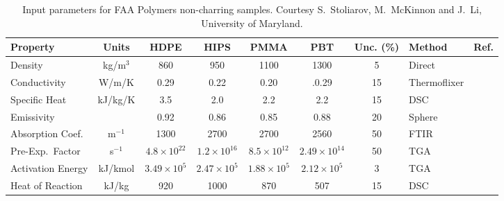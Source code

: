 \begin{table}[h!]
\caption[FAA non-charring polymer properties.]{Input parameters for FAA Polymers non-charring samples. Courtesy S.~Stoliarov, M.~McKinnon and J.~Li, University of Maryland.}
\begin{tabular}{|l|c|c|c|c|c|c|l|l|}
\hline
Property                    & Units         & HDPE                  & HIPS                  & PMMA       &PBT           & Unc. (\%)  & Method                &  Ref.                    \\ \hline \hline
Density                     & kg/m$^3$      & 860                   & 950                   & 1100      &1300             & 5     & Direct                &  \cite{Stoliarov:CF2009}  \\ \hline
Conductivity                & W/m/K         & 0.29                  & 0.22                  & 0.20       &.0.29           & 15    & Thermoflixer          &  \cite{Stoliarov:CF2009}  \\ \hline
Specific Heat               & kJ/kg/K       & 3.5                   & 2.0                   & 2.2    &2.2                & 15    & DSC                   &  \cite{Stoliarov:PDS2008}  \\ \hline
Emissivity                  &               & 0.92                  & 0.86                  & 0.85       &0.88           & 20    & Sphere                &  \cite{Hallman:PES1974}  \\ \hline
Absorption Coef.            & m$^{-1}$      & 1300                  & 2700                  & 2700    & 2560               & 50    & FTIR                  &  \cite{Tsilingiris:ECM2003}  \\ \hline
Pre-Exp.~Factor             & s$^{-1}$      & $4.8 \times 10^{22}$  & $1.2 \times 10^{16}$  & $8.5 \times 10^{12}$   &$2.49 \times 10^{14}$ & 50    & TGA                   &  \cite{Stoliarov:CF2009}  \\ \hline
Activation Energy           & kJ/kmol       & $3.49 \times 10^{5}$  & $2.47 \times 10^{5}$  & $1.88 \times 10^{5}$ &$2.12 \times 10^{5}$ & 3     & TGA                   &  \cite{Stoliarov:CF2009}  \\ \hline
Heat of Reaction            & kJ/kg         & 920                   & 1000                  & 870          &507        & 15    & DSC                   &  \cite{Stoliarov:PDS2008}  \\ \hline
\end{tabular}
\label{FAA_Properties}
\end{table}

